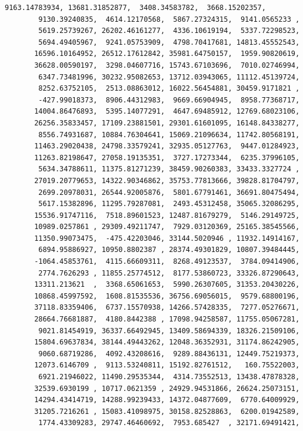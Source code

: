 \documentclass[11pt]{article}
\begin{document}
\begin{tcolorbox}[breakable, size=fbox, boxrule=.5pt, pad at break*=1mm, opacityfill=0]
\begin{Verbatim}[commandchars=\\\{\}]
        9163.14783934, 13681.31852877,  3408.34583782,  3668.15202357,
        9130.39240835,  4614.12170568,  5867.27324315,  9141.0565233 ,
        5619.25739267, 26202.46161277,  4336.10619194,  5337.72298523,
        5694.49405967,  9241.05753909,  4798.70417681, 14813.45552543,
       16596.10164952, 26512.17612842, 35981.64750157,  1959.90820619,
       36628.00590197,  3298.04607716, 15743.67103696,  7010.02746994,
        6347.73481996, 30232.95082653, 13712.03943065, 11112.45139724,
        8252.63752105,  2513.08863012, 16022.56454881, 30459.9171821 ,
        -427.99018373,  8906.44312983,  9669.66904945,  8958.77368717,
       14004.86476893,  5395.14077291,  4647.69485912, 12769.68023106,
       26256.35833457, 17109.23881501, 29301.61601095, 16148.84338277,
        8556.74931687, 10884.76304641, 15069.21096634, 11742.80568191,
       11463.29020438, 24798.33579241, 32935.05127763,  9447.01284923,
       11263.82198647, 27058.19135351,  3727.17273344,  6235.37996105,
        5634.34788611, 11375.81271239, 38459.90260383, 33433.3327724 ,
       27019.20779653, 14322.90346862, 35753.77813666, 39828.81704797,
        2699.20978031, 26544.92005876,  5801.67791461, 36691.80475494,
        5617.15382896, 11295.79287081,  2493.45312458, 35065.32086295,
       15536.91747116,  7518.89601523, 12487.81679279,  5146.29149725,
       10989.0257861 , 29309.49211747,  7929.03120369, 25165.38545566,
       11350.99073475,  -475.42203046, 33144.5020946 , 11932.14914167,
        6894.95886927, 10950.8802387 , 28374.49301829, 10807.39484445,
       -1064.45853761,  4115.66609311,  8268.49123537,  3784.09414906,
        2774.7626293 , 11855.25774512,  8177.53860723, 33326.87290643,
       13311.213621  ,  3368.65061653,  5990.26307605, 31353.20430226,
       10868.45997592,  1608.81535536, 36756.69056015,  9579.68800196,
       37118.83359406,  6737.15570938, 14266.57428335,  7277.05276671,
       28664.76681887,  4180.8442388 , 17098.94258587, 11755.05067281,
        9021.81454919, 36337.66492945, 13409.58694339, 18326.21509106,
       15804.69637834, 38144.49443262, 12048.36352931, 31174.86242905,
        9060.68719286,  4092.43208616,  9289.88436131, 12449.75219373,
       12073.6146709 ,  9113.53240811, 15192.82761512,   160.75522003,
        6921.21946022, 11490.29535344,  4314.73552513, 13438.47878328,
       32539.6930199 , 10717.0621359 , 24929.94531866, 26624.25073151,
       14294.43414719, 14288.99239433, 14372.04877609,  6770.64009929,
       31205.7216261 , 15083.41098975, 30158.82528863,  6200.01942589,
        1774.43309283, 29747.46460692,  7953.685427  , 32171.69491421,

\end{Verbatim}
\end{tcolorbox}
\end{document}
